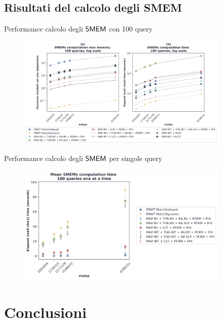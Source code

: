 \documentclass[]{beamer}
\def\SMEM{\mbox{\rm {\sf SMEM}}}
\begin{document}
\subsection{Risultati del calcolo degli SMEM}
\begin{frame}{Performance calcolo degli $\SMEM$ con 100 query}
  \begin{figure}[H]
    \centering
    \includegraphics[width=0.9\textwidth]{img/exe_time_mem_paper.png}
  \end{figure}
\end{frame}
\begin{frame}{Performance calcolo degli $\SMEM$ per singole query}
  \begin{figure}[H]
    \centering
    \includegraphics[width=0.9\textwidth]{img/exe_time_single_paper.png}
  \end{figure}
\end{frame}
\section{Conclusioni}
\end{document}
